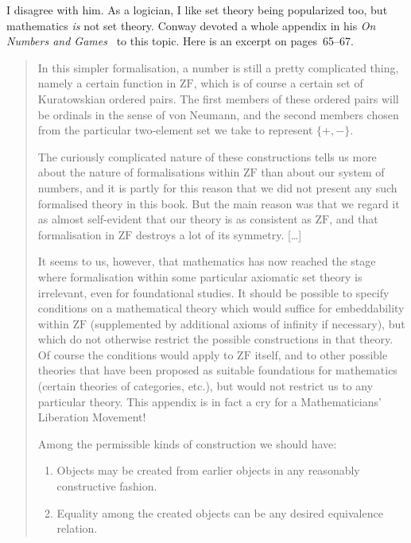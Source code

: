 \documentclass{bhamthesis}
\theoremstyle{definition}
\newcommand{\bktitle}[1]{\textit{#1}}
\newcommand{\ZF}{\mathrm{ZF}}
\begin{document}
I disagree with him.  As a logician, I like set theory being
popularized too, but mathematics \emph{is} not set theory. Conway
devoted a whole appendix in his \bktitle{On Numbers and
Games}~\cite{book:numgames} to this topic.  Here is an excerpt on
pages~65--67.

\begin{quotation}
 In this simpler formalisation, a number is still a pretty
 complicated thing, namely a certain function in $\ZF$, which is
 of course a certain set of Kuratowskian ordered pairs.  The first
 members of these ordered pairs will be ordinals in the sense of
 von Neumann, and the second members chosen from the particular
 two-element set we take to represent $\{{+},{-}\}$.

 The curiously complicated nature of these constructions tells us
 more about the nature of formalisations within $\ZF$ than about
 our system of numbers, and it is partly for this reason that we
 did not present any such formalised theory in this book. But the
 main reason was that we regard it as almost self-evident that our
 theory is as consistent as $\ZF$, and that formalisation in $\ZF$
 destroys a lot of its symmetry.  [\ldots]

 It seems to us, however, that mathematics has now reached the
 stage where formalisation within some particular axiomatic set
 theory is irrelevant, even for foundational studies. It should be
 possible to specify conditions on a mathematical theory which
 would suffice for embeddability within $\ZF$ (supplemented by
 additional axioms of infinity if necessary), but which do not
 otherwise restrict the possible constructions in that theory. Of
 course the conditions would apply to $\ZF$ itself, and to other
 possible theories that have been proposed as suitable foundations
 for mathematics (certain theories of categories, etc.), but would
 not restrict us to any particular theory.  This appendix is in
 fact a cry for a Mathematicians' Liberation Movement!

 Among the permissible kinds of construction we should have:
 \begin{enumerate}
 \renewcommand{\theenumi}{\roman{enumi}}  %
 \renewcommand{\labelenumi}{(\theenumi)}
 \item Objects may be created from earlier objects in any
   reasonably constructive fashion.
 \item Equality among the created objects can be any desired
   equivalence relation.
 \end{enumerate}


\end{quotation}
\end{document}
